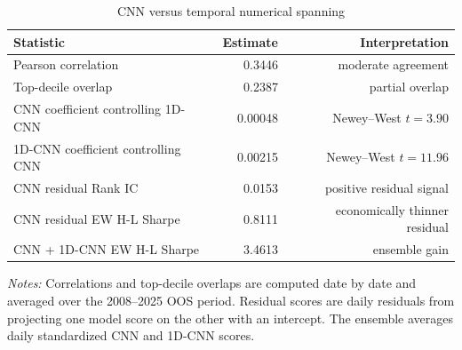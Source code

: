 \begin{table}[htbp]
\centering
\caption{CNN versus temporal numerical spanning}
\label{tab:temporal_spanning}
\begin{tabular}{lrr}
\toprule
Statistic & Estimate & Interpretation \\
\midrule
Pearson correlation & 0.3446 & moderate agreement \\
Top-decile overlap & 0.2387 & partial overlap \\
CNN coefficient controlling 1D-CNN & 0.00048 & Newey--West $t=3.90$ \\
1D-CNN coefficient controlling CNN & 0.00215 & Newey--West $t=11.96$ \\
CNN residual Rank IC & 0.0153 & positive residual signal \\
CNN residual EW H-L Sharpe & 0.8111 & economically thinner residual \\
CNN + 1D-CNN EW H-L Sharpe & 3.4613 & ensemble gain \\
\bottomrule
\end{tabular}
\begin{minipage}{0.94\linewidth}
\footnotesize
\textit{Notes:} Correlations and top-decile overlaps are computed date by date and averaged over the 2008--2025 OOS period. Residual scores are daily residuals from projecting one model score on the other with an intercept. The ensemble averages daily standardized CNN and 1D-CNN scores.
\end{minipage}
\end{table}
